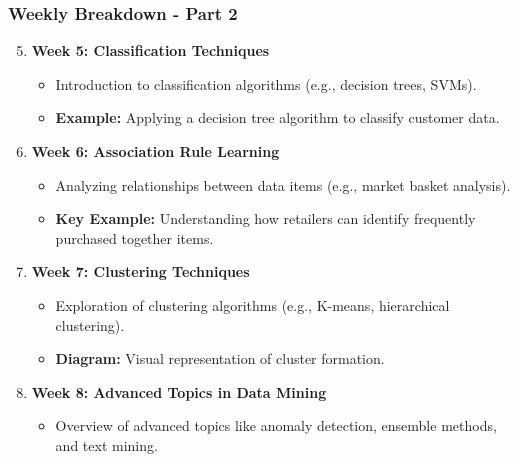 \documentclass[aspectratio=169]{beamer}
\begin{document}
\begin{frame}[fragile]
    \frametitle{Weekly Breakdown - Part 2}
    \begin{enumerate}
        \setcounter{enumi}{4} %
        \item \textbf{Week 5: Classification Techniques}
            \begin{itemize}
                \item Introduction to classification algorithms (e.g., decision trees, SVMs).
                \item \textbf{Example:} Applying a decision tree algorithm to classify customer data.
            \end{itemize}
        \item \textbf{Week 6: Association Rule Learning}
            \begin{itemize}
                \item Analyzing relationships between data items (e.g., market basket analysis).
                \item \textbf{Key Example:} Understanding how retailers can identify frequently purchased together items.
            \end{itemize}
        \item \textbf{Week 7: Clustering Techniques}
            \begin{itemize}
                \item Exploration of clustering algorithms (e.g., K-means, hierarchical clustering).
                \item \textbf{Diagram:} Visual representation of cluster formation.
            \end{itemize}
        \item \textbf{Week 8: Advanced Topics in Data Mining}
            \begin{itemize}
                \item Overview of advanced topics like anomaly detection, ensemble methods, and text mining.
            \end{itemize}
    \end{enumerate}
\end{frame}
\end{document}
